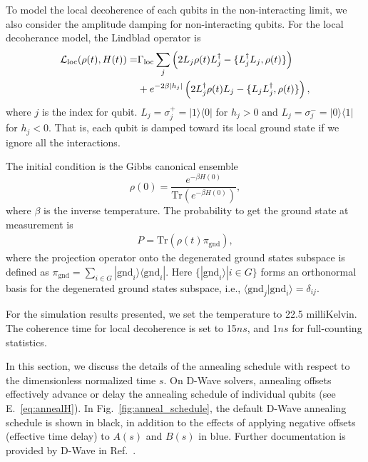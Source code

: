 \documentclass[10pt]{iopart}
\begin{document}
To model the local decoherence of each qubits in the non-interacting limit, we also consider the amplitude damping for non-interacting qubits.
For the local decoherance model, the Lindblad operator is
\begin{align}
\mathcal{L}_{\textrm{loc}}(\rho (t), H(t)) = &  \Gamma_{\textrm{loc}} \sum_j \left(2L_j \rho(t) L_j^\dagger - \{ L^\dagger_j L_j, \rho(t) \} \right)\notag \\
& + e^{- 2 \beta |h_j| }  \left(2L_j^\dagger \rho(t) L_j - \{ L_j L_j^\dagger, \rho(t) \} \right) ,
\end{align}
where $j$ is the index for qubit.
$L_j= \sigma^{+}_j=|1\rangle \langle 0|$ for $h_j>0$ and $L_j= \sigma^{-}_j=|0\rangle \langle 1|$ for $h_j<0$.
That is, each qubit is damped toward its local ground state if we ignore all the interactions.

The initial condition is the Gibbs canonical ensemble
\begin{equation}
\rho (0) =  \frac{e^{-\beta H(0)}}{\mbox{Tr}\left(e^{-\beta H(0)}\right)} ,
\end{equation}
where $\beta$ is the inverse temperature.
The probability to get the ground state at measurement is
\begin{align}
P =  \mbox{Tr} \left( \rho (t) \pi_{\mbox{gnd}} \right)  ,
\end{align}
where the projection operator onto the degenerated ground states subspace is defined as $\pi_{\mbox{gnd}}=\sum_{i\in G} |\mbox{gnd}_i\rangle \langle \mbox{gnd}_i| $.
Here $\{ | \mbox{gnd}_i \rangle | i \in G \}$ forms an orthonormal basis for the degenerated ground states subspace, i.e., $\langle \mbox{gnd}_j | \mbox{gnd}_i \rangle = \delta_{ij}$.

For the simulation results presented, we set the temperature to 22.5 milliKelvin.
The coherence time for local decoherence is set to 15$ns$, and 1$ns$ for full-counting statistics.

In this section, we discuss the details of the annealing schedule with respect to the dimensionless normalized time $s$.
On D-Wave solvers, annealing offsets effectively advance or delay the annealing schedule of individual qubits (see E.~\eqref{eq:annealH}).
In Fig.~\ref{fig:anneal_schedule}, the default D-Wave annealing schedule is shown in black, in addition to the effects of applying negative offsets (effective time delay) to $A(s)$ and $B(s)$ in blue.
Further documentation is provided by D-Wave in Ref.~\cite{dwave_as, dwave_as_docu}.
\end{document}
